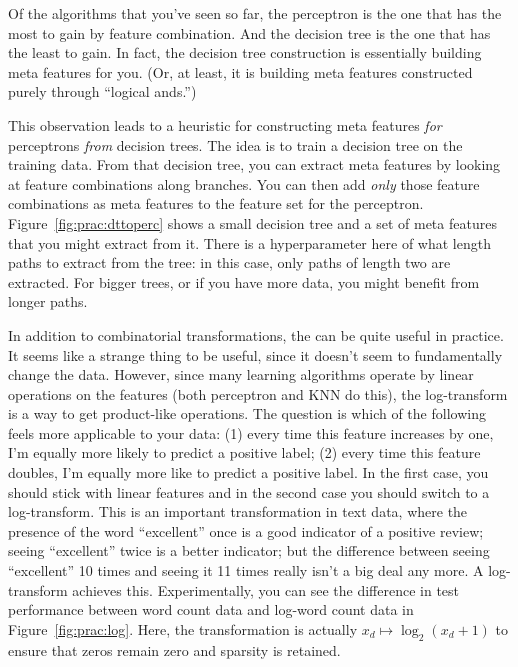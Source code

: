 Of the algorithms that you've seen so far, the perceptron is the one
that has the most to gain by feature combination.  And the decision
tree is the one that has the least to gain.  In fact, the decision
tree construction is essentially building meta features for you.  (Or,
at least, it is building meta features constructed purely through
``logical ands.'')


This observation leads to a heuristic for constructing meta features
\emph{for} perceptrons \emph{from} decision trees.  The idea is to
train a decision tree on the training data.  From that decision tree,
you can extract meta features by looking at feature combinations along
branches.  You can then add \emph{only} those feature combinations as
meta features to the feature set for the perceptron.
Figure~\ref{fig:prac:dttoperc} shows a small decision tree and a set
of meta features that you might extract from it.  There is a
hyperparameter here of what length paths to extract from the tree: in
this case, only paths of length two are extracted.  For bigger trees,
or if you have more data, you might benefit from longer paths.


In addition to combinatorial transformations, the  can be quite useful in practice.  It seems like a
strange thing to be useful, since it doesn't seem to fundamentally
change the data.  However, since many learning algorithms operate by
linear operations on the features (both perceptron and KNN do this),
the log-transform is a way to get product-like operations.  The
question is which of the following feels more applicable to your data:
(1) every time this feature increases by one, I'm equally more likely
to predict a positive label; (2) every time this feature doubles, I'm
equally more like to predict a positive label.  In the first case, you
should stick with linear features and in the second case you should
switch to a log-transform.  This is an important transformation in
text data, where the presence of the word ``excellent'' once is a good
indicator of a positive review; seeing ``excellent'' twice is a better
indicator; but the difference between seeing ``excellent'' 10 times
and seeing it 11 times really isn't a big deal any more.  A
log-transform achieves this.  Experimentally, you can see the
difference in test performance between word count data and log-word
count data in Figure~\ref{fig:prac:log}.  Here, the transformation is
actually $x_d \mapsto \log_2(x_d + 1)$ to ensure that zeros remain
zero and sparsity is retained.

